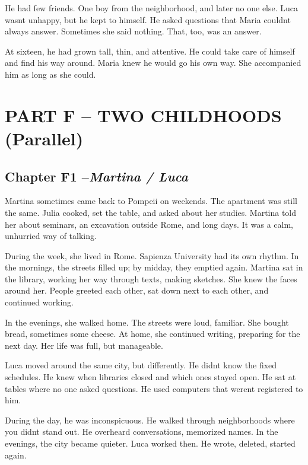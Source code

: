 \documentclass[
]{article}
\begin{document}
He had few friends. One boy from the neighborhood, and later no one else. Luca wasn\textquotesingle t unhappy, but he kept to himself. He asked questions that Maria couldn\textquotesingle t always answer. Sometimes she said nothing. That, too, was an answer.

At sixteen, he had grown tall, thin, and attentive. He could take care of himself and find his way around. Maria knew he would go his own way. She accompanied him as long as she could.

\section{PART F -- TWO CHILDHOODS (Parallel)}\label{part-f-two-childhoods-parallel}

\subsection{\texorpdfstring{Chapter F1 --\emph{Martina / Luca}}{Chapter F1 --Martina / Luca}}\label{chapter-f1-martina-luca}

Martina sometimes came back to Pompeii on weekends. The apartment was still the same. Julia cooked, set the table, and asked about her studies. Martina told her about seminars, an excavation outside Rome, and long days. It was a calm, unhurried way of talking.

During the week, she lived in Rome. Sapienza University had its own rhythm. In the mornings, the streets filled up; by midday, they emptied again. Martina sat in the library, working her way through texts, making sketches. She knew the faces around her. People greeted each other, sat down next to each other, and continued working.

In the evenings, she walked home. The streets were loud, familiar. She bought bread, sometimes some cheese. At home, she continued writing, preparing for the next day. Her life was full, but manageable.

Luca moved around the same city, but differently. He didn\textquotesingle t know the fixed schedules. He knew when libraries closed and which ones stayed open. He sat at tables where no one asked questions. He used computers that weren\textquotesingle t registered to him.

During the day, he was inconspicuous. He walked through neighborhoods where you didn\textquotesingle t stand out. He overheard conversations, memorized names. In the evenings, the city became quieter. Luca worked then. He wrote, deleted, started again.
\end{document}
